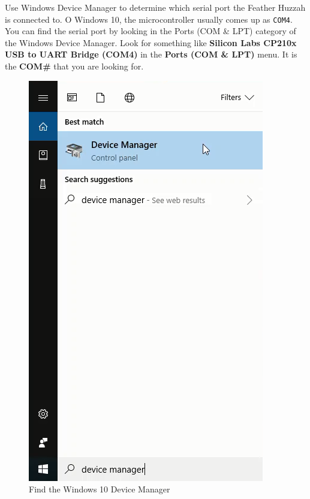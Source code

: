 \documentclass{book}
\makeatletter
\def\maxwidth{\ifdim\Gin@nat@width>\linewidth\linewidth
    \else\Gin@nat@width\fi}
\let\Oldincludegraphics\includegraphics
\renewcommand{\includegraphics}[1]{\Oldincludegraphics[width=.8\maxwidth]{#1}}
\makeatother
\begin{document}
    Use Windows Device Manager to determine which serial port the Feather
Huzzah is connected to. O Windows 10, the microcontroller usually comes
up as \lstinline!COM4!. You can find the serial port by looking in the
Ports (COM \& LPT) category of the Windows Device Manager. Look for
something like \textbf{Silicon Labs CP210x USB to UART Bridge (COM4)} in
the \textbf{Ports (COM \& LPT)} menu. It is the \textbf{COM\#} that you
are looking for.

\begin{figure}
\centering
\includegraphics{images/find_device_manager.png}
\caption{Find the Windows 10 Device Manager}
\end{figure}
\end{document}
